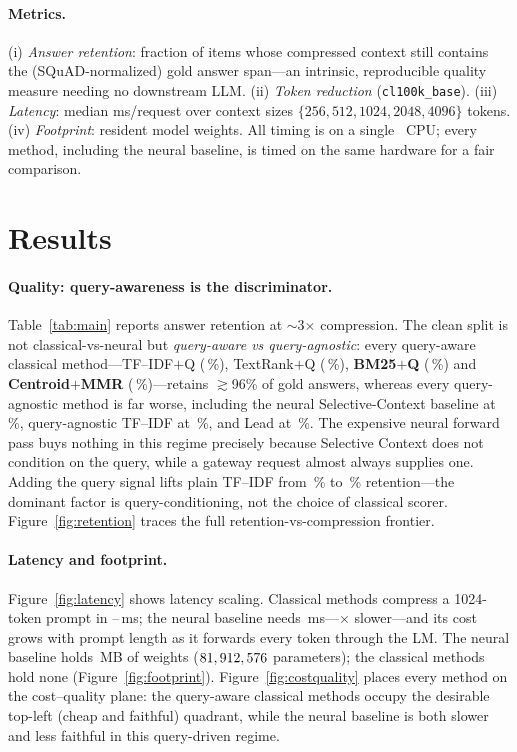 \documentclass[11pt]{article}
\begin{document}
\paragraph{Metrics.} (i) \emph{Answer retention}: fraction of items whose compressed
context still contains the (SQuAD-normalized) gold answer span---an intrinsic,
reproducible quality measure needing no downstream LLM. (ii) \emph{Token reduction}
(\texttt{cl100k\_base}). (iii) \emph{Latency}: median ms/request over context sizes
$\{256,512,1024,2048,4096\}$ tokens. (iv) \emph{Footprint}: resident model weights.
All timing is on a single \machine\ CPU; every method, including the neural baseline,
is timed on the same hardware for a fair comparison.

\section{Results}\label{sec:results}

\paragraph{Quality: query-awareness is the discriminator.} Table~\ref{tab:main}
reports answer retention at $\sim$3$\times$ compression. The clean split is not
classical-vs-neural but \emph{query-aware vs query-agnostic}: every query-aware
classical method---TF--IDF$+$Q (\retTFIDFQ\,\%), TextRank$+$Q (\retTRQ\,\%),
\textbf{BM25$+$Q} (\retBMQ\,\%) and \textbf{Centroid$+$MMR} (\retMMR\,\%)---retains
$\gtrsim$96\% of gold answers, whereas every query-agnostic method is far worse,
including the neural Selective-Context baseline at \retNeural\,\%, query-agnostic
TF--IDF at \retTFIDF\,\%, and Lead at \retLead\,\%. The expensive neural forward pass
buys nothing in this regime precisely because Selective Context does not condition on
the query, while a gateway request almost always supplies one. Adding the query signal
lifts plain TF--IDF from \retTFIDF\,\% to \retTFIDFQ\,\% retention---the dominant factor
is query-conditioning, not the choice of classical scorer. Figure~\ref{fig:retention}
traces the full retention-vs-compression frontier.

\paragraph{Latency and footprint.} Figure~\ref{fig:latency} shows latency scaling.
Classical methods compress a 1024-token prompt in \latRangeLo--\latRangeHi\,ms; the
neural baseline needs \latNeural\,ms---\latSpeedup$\times$ slower---and its cost grows
with prompt length as it forwards every token through the LM. The neural baseline holds
\neuralParamMB\,MB of weights ($81,912,576$ parameters); the classical methods hold
none (Figure~\ref{fig:footprint}). Figure~\ref{fig:costquality} places every method on
the cost--quality plane: the query-aware classical methods occupy the desirable
top-left (cheap and faithful) quadrant, while the neural baseline is both slower and
less faithful in this query-driven regime.
\end{document}
